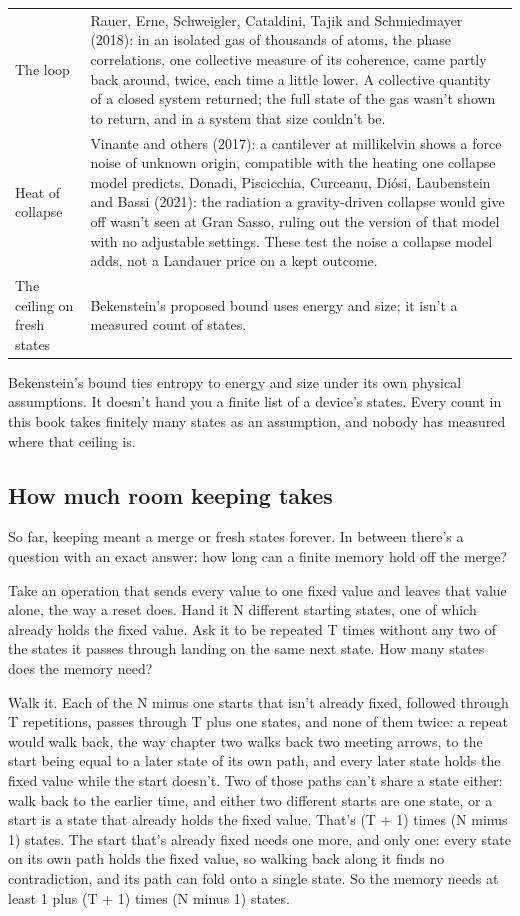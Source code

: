 \documentclass[11pt,twoside]{article}
\theoremstyle{thielethm}
\theoremstyle{thieledef}
\theoremstyle{thieledef}
\theoremstyle{thieledef}
\theoremstyle{thielethm}
\theoremstyle{thieleobs}
\theoremstyle{thielethm}
\begin{document}
\begingroup\small
\begin{longtable}{p{} p{}}
The loop & Rauer, Erne, Schweigler, Cataldini, Tajik and Schmiedmayer (2018): in an isolated
gas of thousands of atoms, the phase correlations, one collective measure of its coherence, came
partly back around, twice, each time a little lower. A collective quantity of a closed system
returned; the full state of the gas wasn't shown to return, and in a system that size couldn't be. \\[3pt]
Heat of collapse & Vinante and others (2017): a cantilever at millikelvin shows a force noise
of unknown origin, compatible with the heating one collapse model predicts. Donadi,
Piscicchia, Curceanu, Di\'osi, Laubenstein and Bassi (2021): the radiation a gravity-driven
collapse would give off wasn't seen at Gran Sasso, ruling out the version of that model with
no adjustable settings. These test the noise a collapse model adds, not a Landauer price on a
kept outcome. \\[3pt]
The ceiling on fresh states & Bekenstein's proposed bound uses energy and size; it isn't a
measured count of states. \\
\end{longtable}
\endgroup

Bekenstein's bound ties entropy to energy and size under its own physical assumptions. It doesn't hand you a finite list of a device's states. Every count in this book takes finitely many states as an assumption, and nobody has measured where that ceiling is.

\subsection{How much room keeping takes}

So far, keeping meant a merge or fresh states forever. In between there's a question with an exact answer: how long can a finite memory hold off the merge?

Take an operation that sends every value to one fixed value and leaves that value alone, the way a reset does. Hand it N different starting states, one of which already holds the fixed value. Ask it to be repeated T times without any two of the states it passes through landing on the same next state. How many states does the memory need?

Walk it. Each of the N minus one starts that isn't already fixed, followed through T repetitions, passes through T plus one states, and none of them twice: a repeat would walk back, the way chapter two walks back two meeting arrows, to the start being equal to a later state of its own path, and every later state holds the fixed value while the start doesn't. Two of those paths can't share a state either: walk back to the earlier time, and either two different starts are one state, or a start is a state that already holds the fixed value. That's (T + 1) times (N minus 1) states. The start that's already fixed needs one more, and only one: every state on its own path holds the fixed value, so walking back along it finds no contradiction, and its path can fold onto a single state. So the memory needs at least 1 plus (T + 1) times (N minus 1) states.
\end{document}
